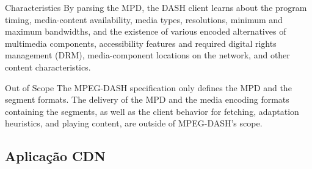 Characteristics
By parsing the MPD, the DASH client learns about the program timing, media-content availability, media types, resolutions, minimum and maximum bandwidths, and the existence of various encoded alternatives of multimedia components, accessibility features and required digital rights management (DRM), media-component locations on the network, and other content characteristics. 

Out of Scope
The MPEG-DASH specification only defines the MPD and the segment formats. The delivery of the MPD and the media encoding formats containing the segments, as well as the client behavior for fetching, adaptation heuristics, and playing content, are outside of MPEG-DASH’s scope.


\subsection{Aplicação CDN }